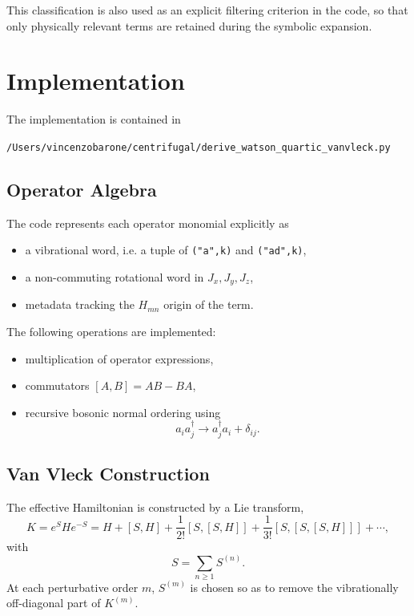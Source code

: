 \documentclass[11pt,a4paper]{article}
\begin{document}
This classification is also used as an explicit filtering criterion in the code, so that only
physically relevant terms are retained during the symbolic expansion.

\section{Implementation}
The implementation is contained in
\begin{center}
\texttt{/Users/vincenzobarone/centrifugal/derive\_watson\_quartic\_vanvleck.py}
\end{center}

\subsection{Operator Algebra}
The code represents each operator monomial explicitly as
\begin{itemize}
\item a vibrational word, i.e. a tuple of \texttt{("a",k)} and \texttt{("ad",k)},
\item a non-commuting rotational word in \(J_x,J_y,J_z\),
\item metadata tracking the \(H_{mn}\) origin of the term.
\end{itemize}

The following operations are implemented:
\begin{itemize}
\item multiplication of operator expressions,
\item commutators \([A,B]=AB-BA\),
\item recursive bosonic normal ordering using
\[
a_i a_j^\dagger \rightarrow a_j^\dagger a_i + \delta_{ij}.
\]
\end{itemize}

\subsection{Van Vleck Construction}
The effective Hamiltonian is constructed by a Lie transform,
\begin{equation}
K = e^{S} H e^{-S}
  = H + [S,H] + \frac{1}{2!}[S,[S,H]] + \frac{1}{3!}[S,[S,[S,H]]] + \cdots,
\end{equation}
with
\begin{equation}
S = \sum_{n\ge1} S^{(n)}.
\end{equation}
At each perturbative order \(m\), \(S^{(m)}\) is chosen so as to remove the vibrationally
off-diagonal part of \(K^{(m)}\).
\end{document}
